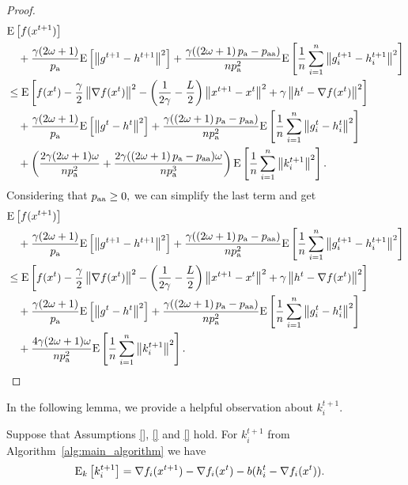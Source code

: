 \documentclass{article}
\newcommand*{\probavailable}{\ensuremath{p_{\textnormal{a}}}}
\newcommand*{\probpairaa}{\ensuremath{p_{\textnormal{aa}}}}
\begin{document}
\begin{proof}
  \begin{align*}
    &\Exp{f(x^{t + 1})} \\
    &\quad  + \frac{\gamma (2 \omega + 1)}{\probavailable} \Exp{\norm{g^{t+1} - h^{t+1}}^2} + \frac{\gamma (\left(2 \omega + 1\right)\probavailable - \probpairaa)}{n \probavailable^2} \Exp{\frac{1}{n}\sum_{i=1}^n\norm{g^{t+1}_i - h^{t+1}_i}^2}\\
    &\leq \Exp{f(x^t) - \frac{\gamma}{2}\norm{\nabla f(x^t)}^2 - \left(\frac{1}{2\gamma} - \frac{L}{2}\right)
    \norm{x^{t+1} - x^t}^2 + \gamma \norm{h^{t} - \nabla f(x^t)}^2}\nonumber\\
    &\quad + \frac{\gamma (2 \omega + 1)}{\probavailable}\Exp{\norm{g^{t} - h^t}^2}+ \frac{\gamma (\left(2 \omega + 1\right)\probavailable - \probpairaa)}{n \probavailable^2}\Exp{\frac{1}{n} \sum_{i=1}^n\norm{g^t_i - h^{t}_i}^2}\nonumber\\
    &\quad + \left(\frac{2 \gamma (2 \omega + 1)\omega}{n \probavailable^2} + \frac{2 \gamma (\left(2 \omega + 1\right)\probavailable - \probpairaa) \omega}{n \probavailable^3}\right)\Exp{\frac{1}{n} \sum_{i=1}^n\norm{k^{t+1}_i}^2}.
  \end{align*}
  Considering that $\probpairaa \geq 0,$ we can simplify the last term and get
  \begin{align*}
    &\Exp{f(x^{t + 1})} \\
    &\quad  + \frac{\gamma (2 \omega + 1)}{\probavailable} \Exp{\norm{g^{t+1} - h^{t+1}}^2} + \frac{\gamma (\left(2 \omega + 1\right)\probavailable - \probpairaa)}{n \probavailable^2} \Exp{\frac{1}{n}\sum_{i=1}^n\norm{g^{t+1}_i - h^{t+1}_i}^2}\\
    &\leq \Exp{f(x^t) - \frac{\gamma}{2}\norm{\nabla f(x^t)}^2 - \left(\frac{1}{2\gamma} - \frac{L}{2}\right)
    \norm{x^{t+1} - x^t}^2 + \gamma \norm{h^{t} - \nabla f(x^t)}^2}\nonumber\\
    &\quad + \frac{\gamma (2 \omega + 1)}{\probavailable}\Exp{\norm{g^{t} - h^t}^2}+ \frac{\gamma (\left(2 \omega + 1\right)\probavailable - \probpairaa)}{n \probavailable^2}\Exp{\frac{1}{n} \sum_{i=1}^n\norm{g^t_i - h^{t}_i}^2}\nonumber\\
    &\quad + \frac{4 \gamma (2 \omega + 1)\omega}{n \probavailable^2} \Exp{\frac{1}{n} \sum_{i=1}^n\norm{k^{t+1}_i}^2}.
  \end{align*}
\end{proof}

In the following lemma, we provide a helpful observation about $k^{t+1}_i$.

\begin{lemma}
  \label{lemma:expectation_k_t}
  Suppose that Assumptions \ref{}, \ref{} and \ref{} hold. For $k^{t+1}_i$ from Algorithm~\ref{alg:main_algorithm} we have
  \begin{align*}
      &{\rm E}_{k}\left[k^{t+1}_i\right] = \nabla f_i(x^{t+1}) - \nabla f_i(x^{t}) - b(h^t_i - \nabla f_i(x^{t})).
  \end{align*}
\end{lemma}
\end{document}
